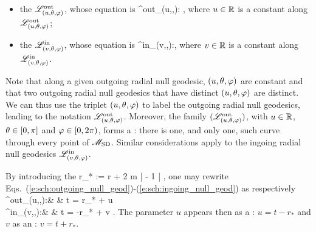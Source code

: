 \begin{itemize}
\item the 
$\mathscr{L}^{\rm out}_{(u,\theta,\varphi)}$, whose
equation is
\be \label{e:sch:outgoing_null_geod}
   \Li^{\rm out}_{(u,\th,\ph)}:\quad
   ,
\ee
where $u\in \mathbb{R}$ is a constant along $\mathscr{L}^{\rm out}_{(u,\theta,\varphi)}$;
\item  the 
$\mathscr{L}^{\rm in}_{(v,\theta,\varphi)}$, whose
equation is
\be \label{e:sch:ingoing_null_geod}
 \Li^{\rm in}_{(v,\th,\ph)}:\quad  {},
\ee
where $v\in \mathbb{R}$ is a constant along $\mathscr{L}^{\rm in}_{(v,\theta,\varphi)}$.
\end{itemize}
Note that along a given outgoing radial null geodesic, $(u,\theta,\varphi)$ are constant and that
two outgoing radial null geodesics that have distinct $(u,\theta,\varphi)$ are distinct. We can thus
use the triplet $(u,\theta,\varphi)$ to label the outgoing radial null geodesics,
leading to the notation $\mathscr{L}^{\rm out}_{(u,\theta,\varphi)}$. Moreover, the family $(\mathscr{L}^{\rm out}_{(u,\theta,\varphi)})$,
with $u\in\mathbb{R}$, $\theta\in[0,\pi]$ and $\varphi \in [0, 2\pi)$, %
forms a : there is one, and only one, such curve through
every point of $\mathscr{M}_{\rm SD}$. Similar considerations apply to the ingoing radial null geodesics
$\mathscr{L}^{\rm in}_{(v,\theta,\varphi)}$.

By introducing the 
\be \label{e:sch:def_tortoise}
    r_* := r + 2 m \ln \left|  - 1 \right| ,
\ee
one may rewrite Eqs.~(\ref{e:sch:outgoing_null_geod})-(\ref{e:sch:ingoing_null_geod}) as
respectively
\bea
  \Li^{\rm out}_{(u,\th,\ph)}:\quad  &  & t = r_* + u \\
  \Li^{\rm in}_{(v,\th,\ph)}:\quad  &  & t = -r_* + v . \label{e:sch:v_advanced_tortoise}
\eea
The parameter $u$ appears then as a
:
$u = t - r_*$ and $v$ as an
: $v = t + r_*$.

